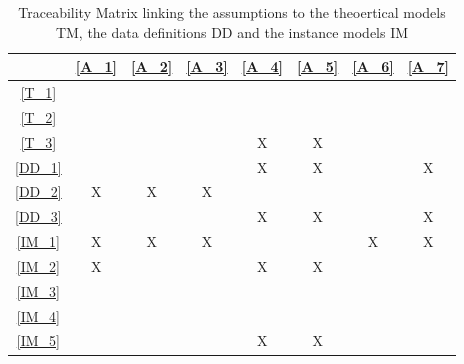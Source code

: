 \documentclass[12pt]{article}
\begin{document}
\begin{table}[H]
\centering
\begin{tabular}{|c|c|c|c|c|c|c|c|}
\hline
	& \cref{A_1} & \cref{A_2} & \cref{A_3} & \cref{A_4} & \cref{A_5} & \cref{A_6} & \cref{A_7} \\
\hline
\cref{T_1}			& & & & & & & \\ \hline
\cref{T_2}			& & & & & & & \\ \hline
\cref{T_3}			& & & & X & X & & \\ \hline
\cref{DD_1}			& & & & X & X & & X \\ \hline
\cref{DD_2}			& X & X & X & & & & \\ \hline
\cref{DD_3}			& & & & X & X & & X \\ \hline
\cref{IM_1}			& X & X & X & & & X & X \\ \hline
\cref{IM_2}			& X & & & X & X & & \\ \hline
\cref{IM_3}			& & & & & & & \\ \hline
\cref{IM_4}			& & & & & & & \\ \hline
\cref{IM_5}			& & & & X & X & & \\ \hline
\end{tabular}
\caption{Traceability Matrix linking the assumptions to the theoertical models TM, the data definitions DD and the instance models IM}\label{tb:Matrix_2}
\end{table}
\end{document}
